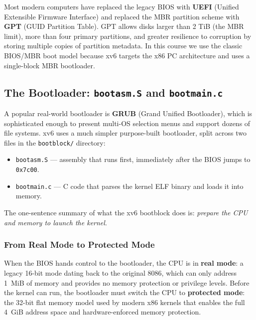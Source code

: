 \documentclass[11pt]{article}
\begin{document}
Most modern computers have replaced the legacy BIOS with \textbf{UEFI} (Unified Extensible Firmware Interface) and replaced the MBR partition scheme with \textbf{GPT} (GUID Partition Table). GPT allows disks larger than 2 TiB (the MBR limit), more than four primary partitions, and greater resilience to corruption by storing multiple copies of partition metadata. In this course we use the classic BIOS/MBR boot model because xv6 targets the x86 PC architecture and uses a single-block MBR bootloader.

\subsection{The Bootloader: \texttt{bootasm.S} and \texttt{bootmain.c}}

A popular real-world bootloader is \textbf{GRUB} (Grand Unified Bootloader), which is sophisticated enough to present multi-OS selection menus and support dozens of file systems. xv6 uses a much simpler purpose-built bootloader, split across two files in the \texttt{bootblock/} directory:

\begin{itemize}
    \item \texttt{bootasm.S} --- assembly that runs first, immediately after the BIOS jumps to \texttt{0x7c00}.
    \item \texttt{bootmain.c} --- C code that parses the kernel ELF binary and loads it into memory.
\end{itemize}

The one-sentence summary of what the xv6 bootblock does is: \emph{prepare the CPU and memory to launch the kernel}.

\subsubsection*{From Real Mode to Protected Mode}

When the BIOS hands control to the bootloader, the CPU is in \textbf{real mode}: a legacy 16-bit mode dating back to the original 8086, which can only address 1~MiB of memory and provides no memory protection or privilege levels. Before the kernel can run, the bootloader must switch the CPU to \textbf{protected mode}: the 32-bit flat memory model used by modern x86 kernels that enables the full 4~GiB address space and hardware-enforced memory protection.
\end{document}
